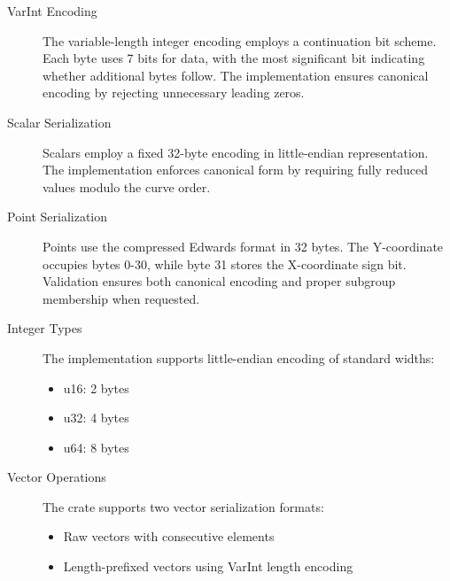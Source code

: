 \begin{description}
\item[VarInt Encoding] The variable-length integer encoding employs a continuation bit scheme.  Each byte uses 7 bits for data, with the most significant bit indicating whether additional bytes follow.  %
The implementation ensures canonical encoding by rejecting unnecessary leading zeros.  %

\item[Scalar Serialization] Scalars employ a fixed 32-byte encoding in little-endian representation.  %
The implementation enforces canonical form by requiring fully reduced values modulo the curve order.  %

\item[Point Serialization] Points use the compressed Edwards format in 32 bytes.  The Y-coordinate occupies bytes 0-30, while byte 31 stores the X-coordinate sign bit.  %
Validation ensures both canonical encoding and proper subgroup membership when requested.  %

\item[Integer Types] The implementation supports little-endian encoding of standard widths: %
\begin{itemize}
\item u16: 2 bytes
\item u32: 4 bytes  
\item u64: 8 bytes
\end{itemize}

\item[Vector Operations] The crate supports two vector serialization formats:
\begin{itemize}
\item Raw vectors with consecutive elements %
\item Length-prefixed vectors using VarInt length encoding %
\end{itemize}
\end{description}

